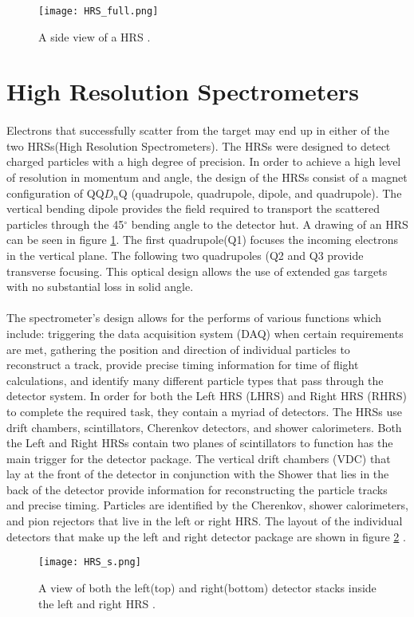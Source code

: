 \begin{figure}[t]
	\centering
	\texttt{[image: HRS\_full.png]}
	\caption{A side view of a HRS \cite{HallA}.
		\label{hrsfull}}
\end{figure}

\section{High Resolution Spectrometers}\label{sec:HRS}
\paragraph{}
Electrons that successfully scatter from the target may end up in either of the two HRSs(High Resolution Spectrometers). The HRSs were designed to detect charged particles with a high degree of precision. 
In order to achieve a high level of resolution in momentum and angle, the design of the HRSs consist of a magnet configuration of QQ$D_n$Q (quadrupole, quadrupole, dipole, and quadrupole). The vertical bending dipole provides the field required to transport the scattered particles through the 45$^\circ$ bending angle to the detector hut. A drawing of an HRS can be seen in figure \ref{hrsfull}. The first quadrupole(Q1) focuses the incoming electrons in the vertical plane. The following two quadrupoles (Q2 and Q3 provide transverse focusing. This optical design allows the use of extended gas targets with no substantial loss in solid angle\cite{HallA}.  
\paragraph{}The spectrometer's design allows for the performs of various functions which include: triggering the data acquisition system (DAQ) when certain requirements are met, gathering the position and direction of individual particles to reconstruct a track, provide precise timing information for time of flight calculations, and identify many different particle types that pass through the detector system. In order for both the Left HRS (LHRS) and Right HRS (RHRS) to  complete the required task, they contain a myriad of detectors. The HRSs use drift chambers, scintillators, Cherenkov detectors, and shower calorimeters. Both the Left and Right HRSs contain two planes of scintillators to function has the main trigger for the detector package. The vertical drift chambers (VDC) that lay at the front of the detector in conjunction with the Shower that lies in the back of the detector provide information for reconstructing the particle tracks and precise timing. Particles are identified by the Cherenkov, shower calorimeters, and pion rejectors that live in the left or right HRS. The layout of the individual detectors that make up the left and right detector package are shown in figure \ref{hrsss}  \cite{HallA}.
\begin{figure}[t]
	\centering
	\texttt{[image: HRS\_s.png]}
	\caption{A view of both the left(top) and right(bottom) detector stacks inside the left and right HRS \cite{HallA}.
	\label{hrsss}}
\end{figure}

